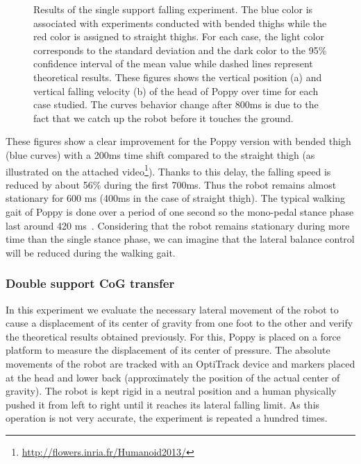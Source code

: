 \begin{figure}[h]
\centering
    \hfil
    \caption{Results of the single support falling experiment.
    The blue color is associated with experiments conducted with bended thighs while the red color is assigned to straight thighs.
    For each case, the light color corresponds to the standard deviation and the dark color to the 95\% confidence interval of the mean value while dashed lines represent theoretical results.
    These figures shows the vertical position (a) and vertical falling velocity (b) of the head of Poppy over time for each case studied.
    The curves behavior change after 800ms is due to the fact that we catch up the robot before it touches the ground.}
    \label{fig:falling_results}
\end{figure}

These figures show a clear improvement for the Poppy version with bended thigh (blue curves) with a 200ms time shift compared to the straight thigh (as illustrated on the attached video\footnote{\url{http://flowers.inria.fr/Humanoid2013/}\label{video}}).
Thanks to this delay, the falling speed is reduced by about 56\% during the first 700ms. Thus the robot remains almost stationary for 600 ms (400ms in the case of straight thigh). The typical walking gait of Poppy is done over a period of one second so the mono-pedal stance phase last around 420 ms~\cite{lapeyre2013poppy}. Considering that the robot remains stationary during more time than the single stance phase, we can imagine that the lateral balance control will be reduced during the walking gait.



\subsubsection{Double support CoG transfer} %
\label{sub:cog_motion}


In this experiment we evaluate the necessary lateral movement of the robot to cause a displacement of its center of gravity from one foot to the other and verify the theoretical results obtained previously. For this, Poppy is placed on a force platform to measure the displacement of its center of pressure. The absolute movements of the robot are tracked with an OptiTrack device and markers placed at the head and lower back (approximately the position of the actual center of gravity). The robot is kept rigid in a neutral position and a human physically pushed it from left to right until it reaches its lateral falling limit. As this operation is not very accurate, the experiment is repeated a hundred times.

